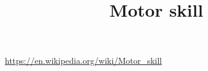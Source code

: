 \documentclass[a4paper]{article}
\title{Motor skill}
\date{}
\begin{document}
    \maketitle

    \url{https://en.wikipedia.org/wiki/Motor_skill}
\end{document}
